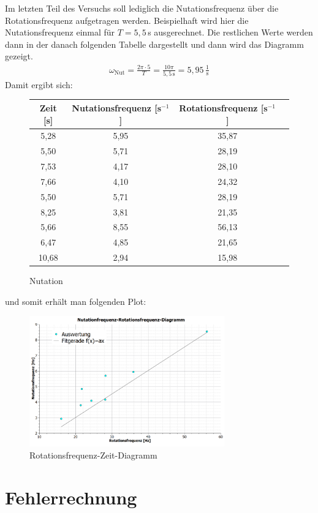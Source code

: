 \documentclass[fontsize=12pt]{scrartcl}
\begin{document}
Im letzten Teil des Versuchs soll lediglich die Nutationsfrequenz über die Rotationsfrequenz aufgetragen werden. Beispielhaft wird hier die Nutationsfrequenz einmal für $T=5,5$\,s ausgerechnet. Die restlichen Werte werden dann in der danach folgenden Tabelle dargestellt und dann wird das Diagramm gezeigt.
\begin{align*}
\omega_{\text{Nut}} = \frac{2\pi \cdot 5}{T} =  \frac{10\pi }{5,5\,\text{s}} = 5,95\,\frac{1}{\text{s}}
\end{align*}
Damit ergibt sich:
\begin{figure}[H]
\vspace{-24pt}
\centering
\caption{Nutation}
\begin{tabular}{|c|c|c|c|} \hline
Zeit [s]& Nutationsfrequenz  [s$^{-1}$] & Rotationsfrequenz  [s$^{-1}$] \\ \hline
5,28	&5,95	&35,87\\ \hline
5,50	&5,71	&28,19\\ \hline
7,53	&4,17	&28,10\\ \hline
7,66	&4,10	&24,32\\ \hline
5,50	&5,71	&28,19\\ \hline
8,25	&3,81	&21,35\\ \hline
5,66	&8,55	&56,13\\ \hline
6,47	&4,85	&21,65\\ \hline
10,68 &2,94	&15,98\\ \hline
\end{tabular}				 
\end{figure}

und somit erhält man folgenden Plot:
\begin{figure}[H]
\centering
\includegraphics[width=0.75\textwidth]{Graphik/Nut}
\caption{Rotationsfrequenz-Zeit-Diagramm}
\end{figure}

\section{Fehlerrechnung}
\end{document}
